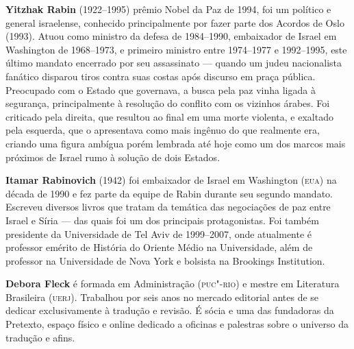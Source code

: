 \textbf{Yitzhak Rabin} (1922--1995) prêmio Nobel da Paz de 1994, foi um político e general israelense, conhecido principalmente por fazer parte dos Acordos de Oslo (1993). Atuou como ministro da defesa de 1984--1990, embaixador de Israel em Washington de 1968--1973, e primeiro ministro entre 1974--1977 e 1992--1995, este último mandato encerrado por seu assassinato --- quando um judeu nacionalista fanático disparou tiros contra suas costas após discurso em praça pública. Preocupado com o Estado que governava, a busca pela paz vinha ligada à segurança, principalmente à resolução do conflito com os vizinhos árabes. Foi criticado pela direita, que resultou ao final em uma morte violenta, e exaltado pela esquerda, que o apresentava como mais ingênuo do que realmente era, criando uma figura ambígua porém lembrada até hoje como um dos marcos mais próximos de Israel rumo à solução de dois Estados.


\textbf{Itamar Rabinovich} (1942) foi embaixador de Israel em Washington (\textsc{eua}) na década de 1990 e fez parte da equipe de Rabin durante seu segundo mandato. Escreveu diversos livros que tratam da temática das negociações de paz entre Israel e Síria --- das quais foi um dos principais protagonistas. Foi também presidente da Universidade de Tel Aviv de 1999--2007, onde atualmente é professor emérito de História do Oriente Médio na Universidade, além de professor na Universidade de Nova York e bolsista na Brookings Institution.

\pagebreak
\thispagestyle{empty}

\textbf{Debora Fleck} é formada em Administração (\textsc{puc"-rio}) e mestre em Literatura Brasileira (\textsc{uerj}). Trabalhou por seis anos no mercado editorial antes de se dedicar exclusivamente à tradução e revisão. É sócia e uma das fundadoras da Pretexto, espaço físico e online dedicado a oficinas e palestras sobre o universo da tradução e afins.

